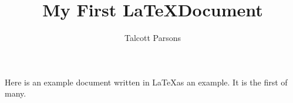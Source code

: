 \documentclass[11pt,article,oneside]{memoir}
\title{My First \LaTeX Document}
\author{Talcott Parsons}
\begin{document}
\maketitle 

Here is an example document written in \LaTeX as an example. It is the first of many.
\end{document}
